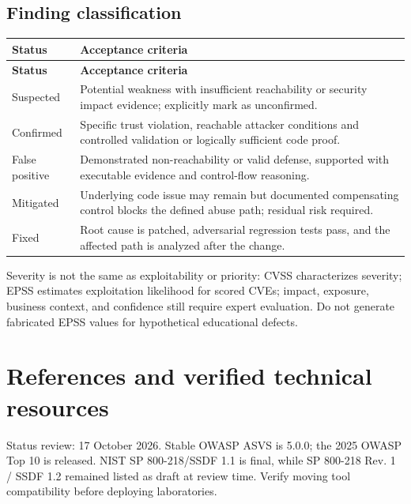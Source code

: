 \documentclass[10pt,letterpaper]{article}
\begin{document}
\subsection{Finding classification}
\begingroup\footnotesize\setlength\tabcolsep{3pt}
\begin{longtable}{>{\raggedright\arraybackslash}p{}>{\raggedright\arraybackslash}p{}}\toprule
\textbf{Status} & \textbf{Acceptance criteria}\\\midrule\endfirsthead
\toprule \textbf{Status} & \textbf{Acceptance criteria}\\\midrule\endhead
Suspected & Potential weakness with insufficient reachability or security impact evidence; explicitly mark as unconfirmed.\\\midrule
Confirmed & Specific trust violation, reachable attacker conditions and controlled validation or logically sufficient code proof.\\\midrule
False positive & Demonstrated non-reachability or valid defense, supported with executable evidence and control-flow reasoning.\\\midrule
Mitigated & Underlying code issue may remain but documented compensating control blocks the defined abuse path; residual risk required.\\\midrule
Fixed & Root cause is patched, adversarial regression tests pass, and the affected path is analyzed after the change.\\\midrule
\bottomrule\end{longtable}\endgroup
Severity is not the same as exploitability or priority: CVSS characterizes severity; EPSS estimates exploitation likelihood for scored CVEs; impact, exposure, business context, and confidence still require expert evaluation. Do not generate fabricated EPSS values for hypothetical educational defects.

\section{References and verified technical resources}
Status review: 17 October 2026. Stable OWASP ASVS is 5.0.0; the 2025 OWASP Top 10 is released. NIST SP 800-218/SSDF 1.1 is final, while SP 800-218 Rev. 1 / SSDF 1.2 remained listed as draft at review time. Verify moving tool compatibility before deploying laboratories.
\end{document}
